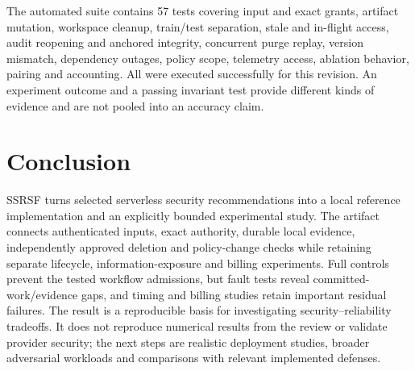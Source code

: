 \documentclass[11pt,a4paper]{article}
\newcommand{\TestCount}{57}
\begin{document}
The automated suite contains \TestCount{} tests covering input and exact grants, artifact mutation, workspace cleanup, train/test separation, stale and in-flight access, audit reopening and anchored integrity, concurrent purge replay, version mismatch, dependency outages, policy scope, telemetry access, ablation behavior, pairing and accounting. All were executed successfully for this revision. An experiment outcome and a passing invariant test provide different kinds of evidence and are not pooled into an accuracy claim.

\section{Conclusion}
SSRSF turns selected serverless security recommendations into a local reference implementation and an explicitly bounded experimental study. The artifact connects authenticated inputs, exact authority, durable local evidence, independently approved deletion and policy-change checks while retaining separate lifecycle, information-exposure and billing experiments. Full controls prevent the tested workflow admissions, but fault tests reveal committed-work/evidence gaps, and timing and billing studies retain important residual failures. The result is a reproducible basis for investigating security--reliability tradeoffs. It does not reproduce numerical results from the review or validate provider security; the next steps are realistic deployment studies, broader adversarial workloads and comparisons with relevant implemented defenses.
\end{document}
